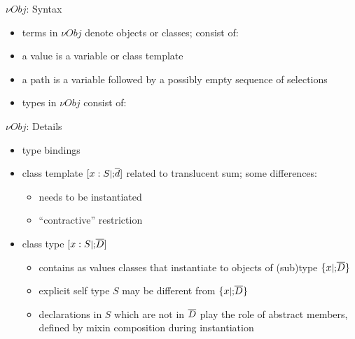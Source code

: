 \documentclass{beamer}
\begin{document}
\begin{frame}{${\nu}Obj$: Syntax}
\begin{itemize}
\item terms in ${\nu}Obj$ denote objects or classes; consist of:
\item a value is a variable or class template
\item a path is a variable followed by a possibly empty sequence of selections
\item types in ${\nu}Obj$ consist of:
\end{itemize}
\end{frame}

\begin{frame}{${\nu}Obj$: Details}
\begin{itemize}
\item type bindings
\item class template $[x: S \mbox{\small $|;$} \overline d]$ related to translucent sum; some differences:
\begin{itemize}
\item needs to be instantiated
\item ``contractive'' restriction
\end{itemize}
\item class type $[x: S \mbox{\small $|;$} \overline D]$
\begin{itemize}
\item contains as values classes that instantiate to objects of (sub)type $\{x \mbox{\small $|;$} \overline D\}$
\item explicit self type $S$ may be different from $\{x \mbox{\small $|;$} \overline D\}$
\item declarations in $S$ which are not in $\overline D$ play the role of abstract members, defined by mixin composition during instantiation
\end{itemize}
\end{itemize}
\end{frame}
\end{document}
